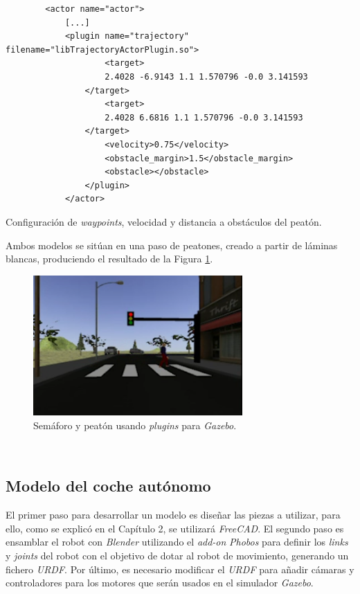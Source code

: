 \begin{code}[h]
	\begin{lstlisting}
		<actor name="actor">
			[...]
			<plugin name="trajectory" filename="libTrajectoryActorPlugin.so">
					<target>
					2.4028 -6.9143 1.1 1.570796 -0.0 3.141593
				</target>
					<target>
					2.4028 6.6816 1.1 1.570796 -0.0 3.141593
				</target>
					<velocity>0.75</velocity>
					<obstacle_margin>1.5</obstacle_margin>
					<obstacle></obstacle>
				</plugin>
			</actor>
	\end{lstlisting}
	\caption[Configuración de \textit{waypoints}, velocidad y distancia a obstáculos del peatón.]{Configuración de \textit{waypoints}, velocidad y distancia a obstáculos del
		peatón.}
	\label{cod:pedestrianconfiguration}
\end{code}

Ambos modelos se sitúan en una paso de peatones, creado a partir de láminas blancas, produciendo el resultado de la Figura \ref{fig:trafficlightpedestrian}.\\

\begin{figure} [h!]
	\begin{center}
		\includegraphics[width=8cm]{figs/trafficlightpedestrian}
	\end{center}
	\caption{Semáforo y peatón usando \textit{plugins} para \textit{Gazebo}.}
	\label{fig:trafficlightpedestrian}
\end{figure}\

\subsection{Modelo del coche autónomo}
\label{subsection:vehiclemodel}
El primer paso para desarrollar un modelo es diseñar las piezas a utilizar, para ello, como se explicó en el Capítulo 2, se utilizará \textit{FreeCAD}. El segundo paso es ensamblar el robot con \textit{Blender} utilizando el \textit{add-on} \textit{Phobos} para definir los \textit{links} y \textit{joints} del robot con el objetivo de dotar al robot de movimiento, generando un fichero \textit{URDF}. Por último, es necesario modificar el \textit{URDF} para añadir cámaras y controladores para los motores que serán usados en el simulador \textit{Gazebo}.\\

